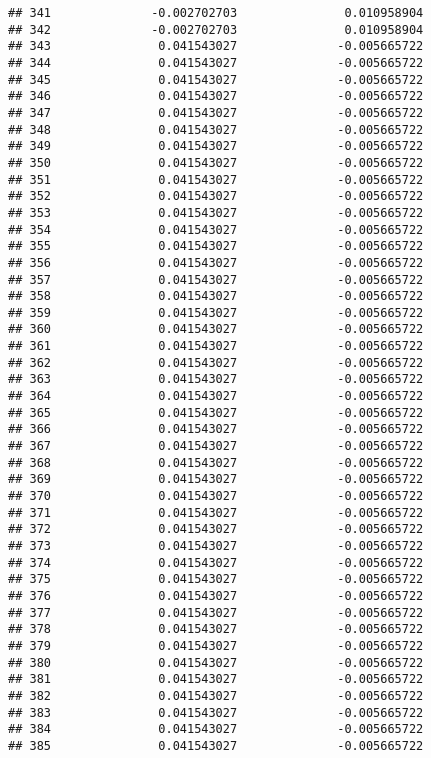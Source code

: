 \documentclass[]{article}
\begin{document}
\begin{verbatim}
## 341              -0.002702703               0.010958904
## 342              -0.002702703               0.010958904
## 343               0.041543027              -0.005665722
## 344               0.041543027              -0.005665722
## 345               0.041543027              -0.005665722
## 346               0.041543027              -0.005665722
## 347               0.041543027              -0.005665722
## 348               0.041543027              -0.005665722
## 349               0.041543027              -0.005665722
## 350               0.041543027              -0.005665722
## 351               0.041543027              -0.005665722
## 352               0.041543027              -0.005665722
## 353               0.041543027              -0.005665722
## 354               0.041543027              -0.005665722
## 355               0.041543027              -0.005665722
## 356               0.041543027              -0.005665722
## 357               0.041543027              -0.005665722
## 358               0.041543027              -0.005665722
## 359               0.041543027              -0.005665722
## 360               0.041543027              -0.005665722
## 361               0.041543027              -0.005665722
## 362               0.041543027              -0.005665722
## 363               0.041543027              -0.005665722
## 364               0.041543027              -0.005665722
## 365               0.041543027              -0.005665722
## 366               0.041543027              -0.005665722
## 367               0.041543027              -0.005665722
## 368               0.041543027              -0.005665722
## 369               0.041543027              -0.005665722
## 370               0.041543027              -0.005665722
## 371               0.041543027              -0.005665722
## 372               0.041543027              -0.005665722
## 373               0.041543027              -0.005665722
## 374               0.041543027              -0.005665722
## 375               0.041543027              -0.005665722
## 376               0.041543027              -0.005665722
## 377               0.041543027              -0.005665722
## 378               0.041543027              -0.005665722
## 379               0.041543027              -0.005665722
## 380               0.041543027              -0.005665722
## 381               0.041543027              -0.005665722
## 382               0.041543027              -0.005665722
## 383               0.041543027              -0.005665722
## 384               0.041543027              -0.005665722
## 385               0.041543027              -0.005665722

\end{verbatim}
\end{document}
